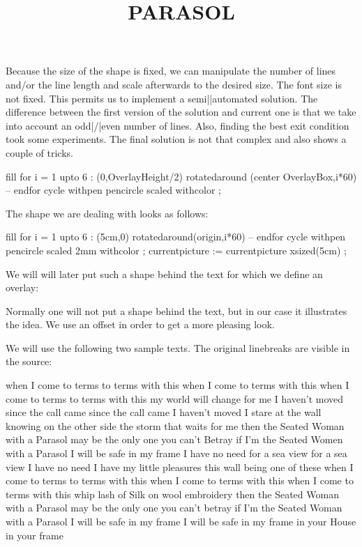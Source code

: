 Because the size of the shape is fixed, we can manipulate the number of lines
and/or the line length and scale afterwards to the desired size. The font size is
not fixed. This permits us to implement a semi||automated solution. The
difference between the first version of the solution and current one is that we
take into account an odd|/|even number of lines. Also, finding the best exit
condition took some experiments. The final solution is not that complex and also
shows a couple of tricks.

\startbuffer
\definecolor[BeeColorA][r=.4,g=.5,b=.6]
\definecolor[BeeColorB][r=.5,g=.6,b=.4]
\definecolor[BeeColorC][r=.6,g=.4,b=.5]

\definecolor[BeeColor] [BeeColorA]


  fill
    for i = 1 upto 6 : (0,OverlayHeight/2)
      rotatedaround (center OverlayBox,i*60) --
    endfor cycle
    withpen pencircle scaled 
    withcolor  ;
\stopuniqueMPgraphic
\stopbuffer

\getbuffer

The shape we are dealing with looks as follows:

\startlinecorrection
\startMPcode
  fill
    for i = 1 upto 6 : (5cm,0)
      rotatedaround(origin,i*60) --
    endfor cycle
    withpen pencircle scaled 2mm
    withcolor  ;
  currentpicture := currentpicture xsized(5cm) ;
\stopMPcode
\stoplinecorrection

We will will later put such a shape behind the text for which we define an
overlay:

\typebuffer

Normally one will not put a shape behind the text, but in our case it illustrates
the idea. We use an offset in order to get a more pleasing look.

We will use the following two sample texts. The original linebreaks are visible
in the source:

\startbuffer
\startbuffer[parasol]
\title {PARASOL} when I come to
terms to terms with this when
I come to terms with this when I
come to terms to terms with this my
world will change for me I haven't moved
since the call came since the call came I
haven't moved I stare at the wall knowing on the
other side the storm that waits for me then the
Seated Woman with a Parasol may be the only one you
can't Betray if I'm the Seated Women with a Parasol I will
be safe in my frame I have no need for a sea view for a sea
view I have no need I have my little pleasures this wall
being one of these when I come to terms to terms
with this when I come to terms with this when I
come to terms with this whip lash of Silk on
wool embroidery then the Seated Woman
with a Parasol may be the only one you
can't betray if I'm the Seated Woman
with a Parasol I will be safe in my
frame I will be safe in my frame
in your House in your frame
\stopbuffer

